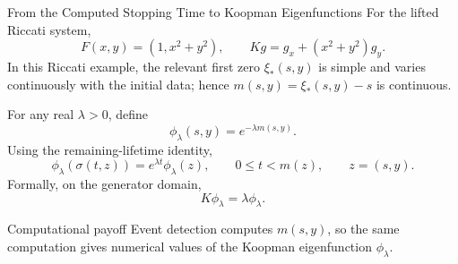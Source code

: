 \documentclass[aspectratio=169,11pt]{beamer}
\newcommand{\flow}{\sigma}
\begin{document}
\begin{frame}{From the Computed Stopping Time to Koopman Eigenfunctions}
\footnotesize
For the lifted Riccati system,
\[
F(x,y)=(1,x^2+y^2),
\qquad
\boxed{Kg=g_x+(x^2+y^2)g_y.}
\]
In this Riccati example, the relevant first zero \(\xi_*(s,y)\) is simple and varies continuously with the initial data; hence \(m(s,y)=\xi_*(s,y)-s\) is continuous.

For any real \(\lambda>0\), define
\[
\boxed{\phi_\lambda(s,y)=e^{-\lambda m(s,y)}.}
\]
Using the remaining-lifetime identity,
\[
\phi_\lambda(\flow(t,z))=e^{\lambda t}\phi_\lambda(z),
\qquad 0\le t<m(z),\qquad z=(s,y).
\]
Formally, on the generator domain,
\[
\boxed{K\phi_\lambda=\lambda\phi_\lambda.}
\]

\begin{alertblock}{Computational payoff}
Event detection computes \(m(s,y)\), so the same computation gives numerical values of the Koopman eigenfunction \(\phi_\lambda\).
\end{alertblock}
\end{frame}
\end{document}
